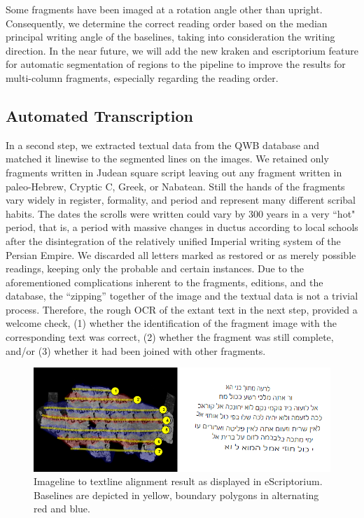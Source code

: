 Some fragments have been imaged at a rotation angle other than upright.
Consequently, we determine the correct reading order based on the median
principal writing angle of the baselines, taking into consideration the writing
direction.  In the near future, we will add the new kraken and escriptorium
feature for automatic segmentation of regions to the pipeline to improve the
results for multi-column fragments, especially regarding the reading
order\cite{KiesslingICFHR2020}. 

\subsection{Automated Transcription}\label{sec:trans}\label{sec:id}

In a second step, we extracted textual data from the QWB database and matched
it linewise to the segmented lines on the images.  We retained only fragments
written in Judean square script leaving out any fragment written in
paleo-Hebrew, Cryptic C, Greek, or Nabatean.  Still the hands of the fragments
vary widely in register, formality, and period and represent many different
scribal habits.  The dates the scrolls were written could vary by 300 years in
a very ``hot" period, that is, a period with massive changes in ductus
according to local schools after the disintegration of the relatively unified
Imperial writing system of the Persian Empire. We discarded all letters marked
as restored or as merely possible readings, keeping only the probable and
certain instances.  Due to the aforementioned complications inherent to the
fragments, editions, and the database, the ``zipping'' together of the image
and the textual data is not a trivial process.  Therefore, the rough OCR of the
extant text in the next step, provided a welcome check, (1) whether the
identification of the fragment image with the corresponding text was correct,
(2) whether the fragment was still complete, and/or (3) whether it had been
joined with other fragments.

\begin{figure}[t]%
	\includegraphics[width=1\columnwidth]{images/40b.PNG}
	\caption{Imageline to textline alignment result as displayed in
	eScriptorium. Baselines are depicted in yellow, boundary polygons in
	alternating red and blue.} \vspace*{-5mm} \label{fig:algn_alignment_result}
\end{figure}

